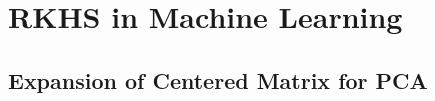 
\section{RKHS in Machine Learning}
\subsection{Expansion of Centered Matrix for PCA}
\label{appendix:pca-center-matrix}

